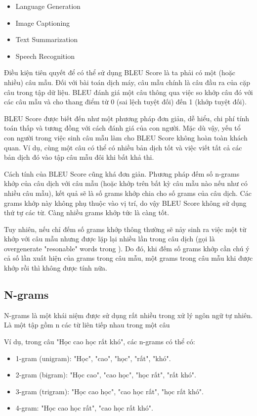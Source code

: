 \documentclass[14pt, a4paper]{article}
\numberwithin{equation}{section}
\numberwithin{algorithm}{section}
\numberwithin{figure}{section}
\numberwithin{table}{section}
\numberwithin{dl}{section}
\numberwithin{md}{section}
\numberwithin{bd}{section}
\numberwithin{dn}{section}
\numberwithin{hq}{section}
\begin{document}
    \begin{itemize}
        \item Language Generation
        \item Image Captioning
        \item Text Summarization
        \item Speech Recognition
    \end{itemize}

    Điều kiện tiên quyết để có thể sử dụng BLEU Score là ta phải có một (hoặc nhiều) câu mẫu. Đối với bài toán dịch máy, câu mẫu chính là câu đầu ra của cặp câu trong tập dữ liệu. BLEU đánh giá một câu thông qua việc so khớp câu đó với các câu mẫu và cho thang điểm từ 0 (sai lệch tuyệt đối) đến 1 (khớp tuyệt đối).
    
    BLEU Score được biết đến như một phương pháp đơn giản, dễ hiểu, chi phí tính toán thấp và tương đồng với cách đánh giá của con người. Mặc dù vậy, yếu tổ con người trong việc sinh câu mẫu làm cho BLEU Score không hoàn toàn khách quan. Ví dụ, cùng một câu có thể có nhiều bản dịch tốt và việc viết tất cả các bản dịch đó vào tập câu mẫu đôi khi bất khả thi.

    Cách tính của BLEU Score cũng khá đơn giản. Phương pháp đếm số n-grams khớp của câu dịch với câu mẫu (hoặc khớp trên bất kỳ câu mẫu nào nếu như có nhiều câu mẫu), kết quả sẽ là số grams khớp chia cho số grams của câu dịch. Các grams khớp này không phụ thuộc vào vị trí, do vậy BLEU Score không sử dụng thứ tự các từ. Càng nhiều grams khớp tức là càng tốt.

    Tuy nhiên, nếu chỉ đếm số grams khớp thông thường sẽ nảy sinh ra việc một từ khớp với câu mẫu nhưng được lặp lại nhiều lần trong câu dịch (gọi là overgenerate "resonable" words trong \cite{papineni2002bleu}).
    Do đó, khi đếm số grams khớp cần chú ý cả số lần xuất hiện của grams trong câu mẫu, một grams trong câu mẫu khi được khớp rồi thì không được tính nữa.

    \subsection{N-grams}

    N-grams là một khái niệm được sử dụng rất nhiều trong xử lý ngôn ngữ tự nhiên. Là một tập gồm n các từ liên tiếp nhau trong một câu

    Ví dụ, trong câu "Học cao học rất khó", các n-grams có thể có:

    \begin{itemize}
        \item 1-gram (unigram): "Học", "cao", "học", "rất", "khó".
        \item 2-gram (bigram): "Học cao", "cao học", "học rất", "rất khó".
        \item 3-gram (trigram): "Học cao học", "cao học rất", "học rất khó".
        \item 4-gram: "Học cao học rất", "cao học rất khó".
    \end{itemize}
\end{document}
